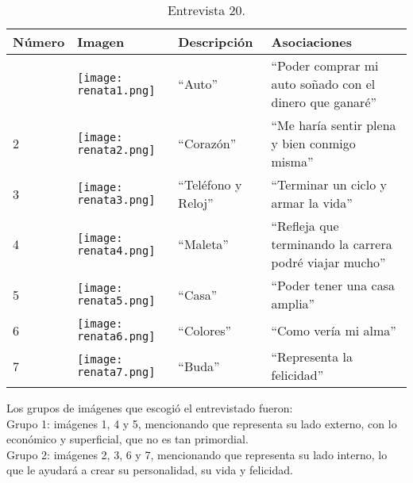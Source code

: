 \begin{table}[H]
	\centering
	\begin{tabular}{>{\centering\arraybackslash}m{1cm} >{\centering\arraybackslash}m{2cm} >{\arraybackslash}m{5cm}>{\arraybackslash}m{5cm}}
		\hline
		Número  & Imagen & Descripción & Asociaciones \\
		\hline \hline
		
		1 & \texttt{[image: renata1.png]} & ``Auto'' & ``Poder comprar mi auto soñado con el dinero que ganaré'' \\
		\hline
		
		2 & \texttt{[image: renata2.png]} & ``Corazón'' & ``Me haría sentir plena y bien conmigo misma'' \\
		\hline
		
		3 & \texttt{[image: renata3.png]} & ``Teléfono y Reloj'' & ``Terminar un ciclo y armar la vida'' \\
		\hline
		
		4 & \texttt{[image: renata4.png]} & ``Maleta'' & ``Refleja que terminando la carrera podré viajar mucho'' \\
		\hline
		
		5 & \texttt{[image: renata5.png]} & ``Casa'' & ``Poder tener una casa amplia'' \\
		\hline
		
		6 & \texttt{[image: renata6.png]} & ``Colores'' & ``Como vería mi alma'' \\
		\hline
		
		7 & \texttt{[image: renata7.png]} & ``Buda'' & ``Representa la felicidad'' \\
		\hline
		
	\end{tabular}
	\caption{Entrevista 20.}
	\label{tabla:renata}
\end{table}

Los grupos de imágenes que escogió el entrevistado fueron:\\

Grupo 1: imágenes 1, 4 y 5, mencionando que representa su lado externo, con lo económico y superficial, que no es tan primordial. \\

Grupo 2: imágenes 2, 3, 6 y 7, mencionando que representa su lado interno, lo que le ayudará a crear su personalidad, su vida y felicidad.\\


